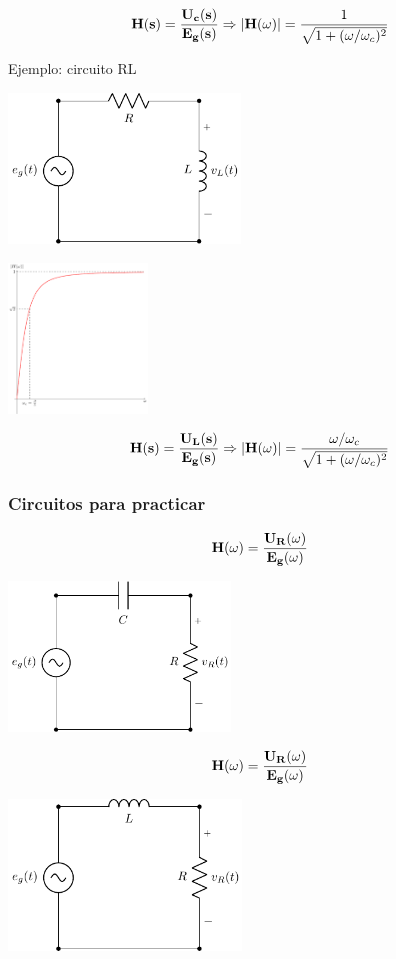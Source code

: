 \[
\mathbf{H}(\mathbf{s}) = \frac{\mathbf{U_c}(\mathbf{s})}{\mathbf{E_g}(\mathbf{s})} \Rightarrow |\mathbf{H}(\omega)| = \frac{1}{\sqrt{1 + (\omega/\omega_c)^2}} 
\]

{Ejemplo: circuito RL}

\begin{center}
\includegraphics[height=4cm]{../figs/filtroRL.pdf}
\end{center}

\begin{center}
\includegraphics[height=4cm]{../figs/Hw_RL.pdf}
\end{center}

\[
\mathbf{H}(\mathbf{s}) = \frac{\mathbf{U_L}(\mathbf{s})}{\mathbf{E_g}(\mathbf{s})} \Rightarrow |\mathbf{H}(\omega)| = \frac{\omega/\omega_c}{\sqrt{1 + (\omega/\omega_c)^2}} 
\]

\subsubsection{Circuitos para practicar}
\label{sec:org68b69b1}


\[
  \mathbf{H}(\omega) = \frac{\mathbf{U_R}(\omega)}{\mathbf{E_g}(\omega)}
\]
\begin{center}
\includegraphics[height=4cm]{../figs/filtroCR.pdf}
\end{center}

\[
  \mathbf{H}(\omega) = \frac{\mathbf{U_R}(\omega)}{\mathbf{E_g}(\omega)}
\]
\begin{center}
\includegraphics[height=4cm]{../figs/filtroLR.pdf}
\end{center}


